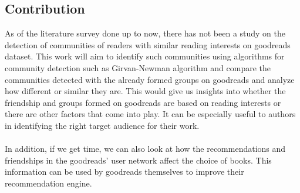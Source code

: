 \documentclass[11pt]{article}
\begin{document}
\subsection{Contribution}
As of the literature survey done up to now, there has not been a study on the detection of communities of readers with similar reading interests on goodreads dataset.
This work will aim to identify such communities using algorithms for community detection such as Girvan-Newman algorithm and compare the communities detected with the already formed groups on goodreads and analyze how different or similar they are.
This would give us insights into whether the friendship and groups formed on goodreads are based on reading interests or there are other factors that come into play. It can be especially useful to authors in identifying the right target audience for their work. \\\\
In addition, if we get time, we can also look at how the recommendations and friendships in the goodreads' user network affect the choice of books. This information can be used by goodreads themselves to improve their recommendation engine.
\end{document}
